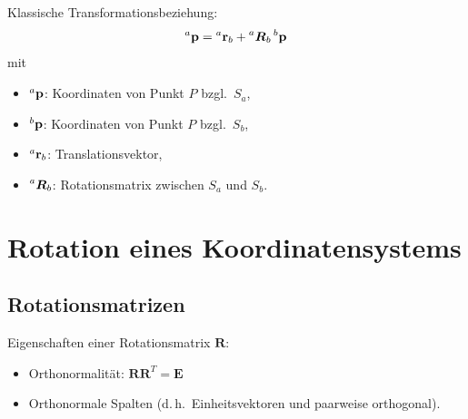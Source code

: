 \documentclass[a4paper, 11pt, accentcolor = tud3b]{tudreport}
\newcommand{\inreferenceto}[2]{\prescript{#1}{}{#2}}
\newcommand{\mat}[1]{\boldsymbol{#1}}
\renewcommand{\vec}[1]{\boldsymbol{\mathbf{#1}}}
\renewcommand{\dh}{d.\,h.~}
\newcommand{\bzgl}{bzgl.~}
\begin{document}
			Klassische Transformationsbeziehung:
			\begin{equation*}
				\inreferenceto{a}{\vec{p}} = \inreferenceto{a}{\vec{r}}_b + \inreferenceto{a}{\mat{R}}_b \inreferenceto{b}{\vec{p}}
			\end{equation*}
			mit
			\begin{itemize}
				\item \( \inreferenceto{a}{\vec{p}} \):   \tabto{1cm} Koordinaten von Punkt \(P\) \bzgl \(S_a\),
				\item \( \inreferenceto{b}{\vec{p}} \):   \tabto{1cm} Koordinaten von Punkt \(P\) \bzgl \(S_b\),
				\item \( \inreferenceto{a}{\vec{r}}_b \): \tabto{1cm} Translationsvektor,
				\item \( \inreferenceto{a}{\mat{R}}_b \): \tabto{1cm} Rotationsmatrix zwischen \(S_a\) und \(S_b\).
			\end{itemize}

		\section{Rotation eines Koordinatensystems}
			\subsection{Rotationsmatrizen}
				Eigenschaften einer Rotationsmatrix \( \mat{R} \):
				\begin{itemize}
					\item Orthonormalität: \( \mat{R} \mat{R}^T = \mat{E} \)
					\item Orthonormale Spalten (\dh Einheitsvektoren und paarweise orthogonal).
				\end{itemize}
			
\end{document}
